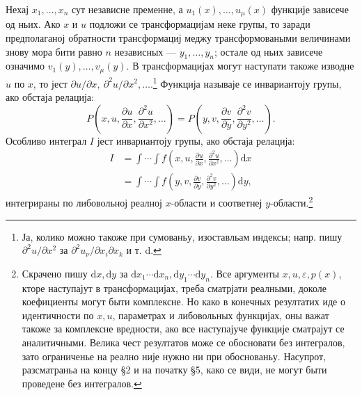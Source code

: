 ﻿\documentclass[11pt]{article}
\providecommand{\eps}{\varepsilon}
\providecommand{\p}{\partial}
\providecommand{\dd}{\mathrm d}
\begin{document}
Нехај \(x_1,\ldots,x_n\) сут независне пременне, а \(u_1(x),\ldots,u_\mu(x)\) функције зависече од ньих. Ако \(x\) и \(u\) подложи се трансформацијам неке групы, то заради предполаганој обратности трансформациј меджу трансформоваными величинами знову мора бити равно \(n\) независных --- \(y_1,\ldots,y_n\); остале од ньих зависече означимо \(v_1(y),\ldots,v_\mu(y)\). В трансформацијах могут наступати такоже изводне \(u\) по \(x\), то јест \(\p u/\p x,\ \p^2u/\p x^2,\ldots\).\footnote{Ја, колико можно такоже при сумованьу, изоставльам индексы; напр. пишу \(\p^2u/\p x^2\) за \(\p^2u_\nu/\p x_i\p x_k\) и т. d.} Функција называје се инвариантоју групы, ако обстаја релација:
\[
P\!\left(x,u,\frac{\p u}{\p x},\frac{\p^2u}{\p x^2},\ldots\right)
 =
P\!\left(y,v,\frac{\p v}{\p y},\frac{\p^2v}{\p y^2},\ldots\right).
\]
Особливо интеграл \(I\) јест инвариантоју групы, ако обстаја релација:
\begin{equation}
\begin{aligned}
I&=\int\!\cdots\!\int f\!\left(x,u,\frac{\p u}{\p x},\frac{\p^2u}{\p x^2},\ldots\right)\dd x\\
 &=\int\!\cdots\!\int f\!\left(y,v,\frac{\p v}{\p y},\frac{\p^2v}{\p y^2},\ldots\right)\dd y,
\end{aligned}
\tag{1}
\end{equation}
интегрираны по либовольној реалној \(x\)-области и соответнеј \(y\)-области.\footnote{Скрачено пишу \(\dd x,\dd y\) за \(\dd x_1\cdots \dd x_n,\dd y_1\cdots \dd y_n\). Все аргументы \(x,u,\eps,p(x)\), кторе наступајут в трансформацијах, треба сматрјати реалными, доколе коефициенты могут быти комплексне. Но како в конечных резултатих иде о идентичности по \(x,u\), параметрах и либовольных функцијах, оны важат такоже за комплексне вредности, ако все наступајуче функције сматрајут се аналитичными. Велика чест резултатов може се обосновати без интегралов, зато ограниченье на реално није нужно ни при обоснованьу. Насупрот, разсматраньа на концу \S{}2 и на початку \S{}5, како се види, не могут быти проведене без интегралов.}
\end{document}
